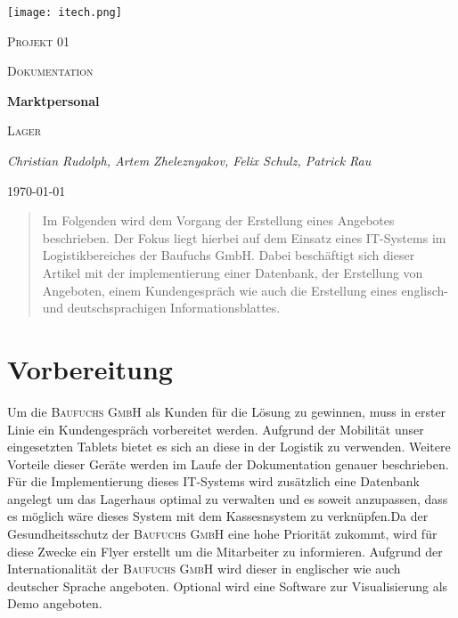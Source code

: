 \documentclass{article}
\begin{document}
\begin{titlepage}
	\centering
	\texttt{[image: itech.png]}\par\vspace{1cm}
	{\scshape\LARGE Projekt 01 \par}
	\vspace{1cm}
	{\scshape\small Dokumentation\par}
	\vspace{1.5cm}
	{\huge\bfseries Marktpersonal \par}
    \vspace{0.5cm}
    {\scshape\small Lager \par}
	
	\vspace{2cm}
	{\Large\itshape Christian Rudolph, Artem Zheleznyakov, Felix Schulz, Patrick Rau\par}
	\vfill
	{\large \today\par}
\end{titlepage}
\tableofcontents
\listoffigures
\newpage
\begin{abstract}
Im Folgenden wird dem Vorgang der Erstellung eines Angebotes beschrieben. Der Fokus liegt hierbei auf dem Einsatz eines IT-Systems im Logistikbereiches der Baufuchs GmbH. Dabei beschäftigt sich dieser Artikel mit der implementierung einer Datenbank, der Erstellung von Angeboten, einem Kundengespräch wie auch die Erstellung eines englisch- und deutschsprachigen Informationsblattes.
\end{abstract}


\section{Vorbereitung}
Um die \textsc{Baufuchs GmbH} als Kunden für die Lösung zu gewinnen, muss in erster Linie ein Kundengespräch vorbereitet werden. Aufgrund der Mobilität unser eingesetzten Tablets bietet es sich an diese in der Logistik zu verwenden. Weitere Vorteile dieser Geräte werden im Laufe der Dokumentation genauer beschrieben. \newline
Für die Implementierung dieses IT-Systems wird zusätzlich eine Datenbank angelegt um das Lagerhaus optimal zu verwalten und es soweit anzupassen, dass es möglich wäre dieses System mit dem Kassesnsystem zu verknüpfen.\newline\newline Da der Gesundheitsschutz der \textsc{Baufuchs GmbH} eine hohe Priorität zukommt, wird für diese Zwecke ein Flyer erstellt um die Mitarbeiter zu informieren. Aufgrund der Internationalität der \textsc{Baufuchs GmbH} wird dieser in englischer wie auch deutscher Sprache angeboten.\newline
Optional wird eine Software zur Visualisierung als Demo angeboten.
\end{document}
